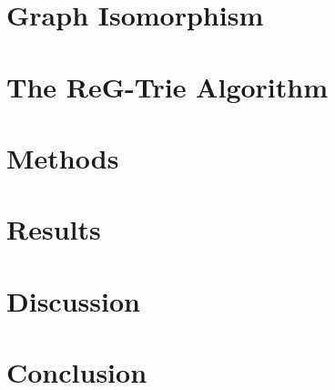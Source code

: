 \documentclass{article}
\begin{document}
\section{Graph Isomorphism}


\section{The ReG-Trie Algorithm}


\section{Methods}



\section{Results}


\section{Discussion}


\section{Conclusion}




\end{document}
